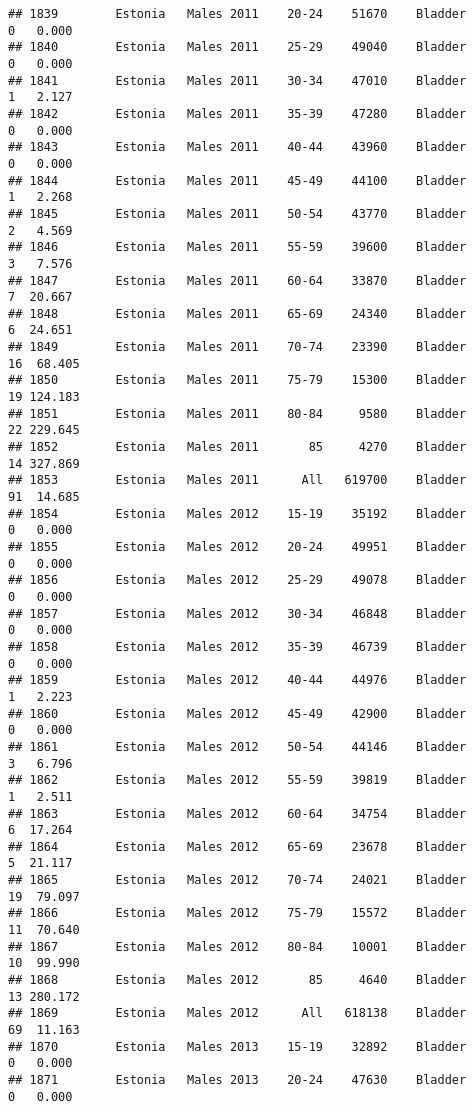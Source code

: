 \documentclass[
]{article}
\begin{document}
\begin{verbatim}
## 1839        Estonia   Males 2011    20-24    51670    Bladder      0   0.000
## 1840        Estonia   Males 2011    25-29    49040    Bladder      0   0.000
## 1841        Estonia   Males 2011    30-34    47010    Bladder      1   2.127
## 1842        Estonia   Males 2011    35-39    47280    Bladder      0   0.000
## 1843        Estonia   Males 2011    40-44    43960    Bladder      0   0.000
## 1844        Estonia   Males 2011    45-49    44100    Bladder      1   2.268
## 1845        Estonia   Males 2011    50-54    43770    Bladder      2   4.569
## 1846        Estonia   Males 2011    55-59    39600    Bladder      3   7.576
## 1847        Estonia   Males 2011    60-64    33870    Bladder      7  20.667
## 1848        Estonia   Males 2011    65-69    24340    Bladder      6  24.651
## 1849        Estonia   Males 2011    70-74    23390    Bladder     16  68.405
## 1850        Estonia   Males 2011    75-79    15300    Bladder     19 124.183
## 1851        Estonia   Males 2011    80-84     9580    Bladder     22 229.645
## 1852        Estonia   Males 2011       85     4270    Bladder     14 327.869
## 1853        Estonia   Males 2011      All   619700    Bladder     91  14.685
## 1854        Estonia   Males 2012    15-19    35192    Bladder      0   0.000
## 1855        Estonia   Males 2012    20-24    49951    Bladder      0   0.000
## 1856        Estonia   Males 2012    25-29    49078    Bladder      0   0.000
## 1857        Estonia   Males 2012    30-34    46848    Bladder      0   0.000
## 1858        Estonia   Males 2012    35-39    46739    Bladder      0   0.000
## 1859        Estonia   Males 2012    40-44    44976    Bladder      1   2.223
## 1860        Estonia   Males 2012    45-49    42900    Bladder      0   0.000
## 1861        Estonia   Males 2012    50-54    44146    Bladder      3   6.796
## 1862        Estonia   Males 2012    55-59    39819    Bladder      1   2.511
## 1863        Estonia   Males 2012    60-64    34754    Bladder      6  17.264
## 1864        Estonia   Males 2012    65-69    23678    Bladder      5  21.117
## 1865        Estonia   Males 2012    70-74    24021    Bladder     19  79.097
## 1866        Estonia   Males 2012    75-79    15572    Bladder     11  70.640
## 1867        Estonia   Males 2012    80-84    10001    Bladder     10  99.990
## 1868        Estonia   Males 2012       85     4640    Bladder     13 280.172
## 1869        Estonia   Males 2012      All   618138    Bladder     69  11.163
## 1870        Estonia   Males 2013    15-19    32892    Bladder      0   0.000
## 1871        Estonia   Males 2013    20-24    47630    Bladder      0   0.000

\end{verbatim}
\end{document}
